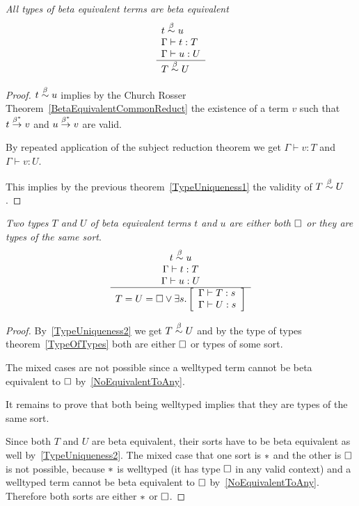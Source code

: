 \begin{theorem}
    \label{TypeUniqueness2}
    \emph{All types of beta equivalent terms are beta equivalent}
    $$
    \begin{array}{l} 
        t \stackrel{\beta}{\sim} u
        \\
        \Gamma \vdash t : T
        \\
        \Gamma \vdash u : U
     \\ \hline 
        T \stackrel{\beta}{\sim} U
    \end{array}
    $$

    \begin{proof}
        $ t \stackrel{\beta}{\sim} u$ implies by the Church Rosser
        Theorem~\ref{BetaEquivalentCommonReduct} the existence of a term $v$
        such that $t \stackrel{\beta^*}{\to} v$ and $u \stackrel{\beta^*}{\to} v$ are valid.

        By repeated application of the subject reduction theorem we get $\Gamma
        \vdash v : T$ and $\Gamma \vdash v : U$.

        This implies by the previous theorem~\ref{TypeUniqueness1} the validity
        of $T \stackrel{\beta}{\sim} U$.
    \end{proof}
\end{theorem}


\begin{corollary}
    \label{TypeUniqueness3}
    \emph{Two types $T$ and $U$ of beta equivalent terms $t$ and $u$ are either
    both $\Box$ or they are types of the same sort}.
    $$
    \begin{array}{c} 
        t \stackrel{\beta}{\sim} u
        \\
        \Gamma \vdash t : T
        \\
        \Gamma \vdash u : U
     \\ \hline 
        T = U = \Box
        \lor
        \exists s.
        \left[
        \begin{array}{l}
            \Gamma \vdash T : s
            \\
            \Gamma \vdash U : s
        \end{array}
        \right]
    \end{array}
    $$

    \begin{proof}
        By~\ref{TypeUniqueness2} we get $T \stackrel{\beta}{\sim} U$ and by the type of types
        theorem~\ref{TypeOfTypes} both are either $\Box$ or types of some sort.

        The mixed cases are not possible since a welltyped term cannot be beta
        equivalent to $\Box$ by~\ref{NoEquivalentToAny}.

        It remains to prove that both being welltyped implies that they are
        types of the same sort.

        Since both $T$ and $U$ are beta equivalent, their sorts have to be beta
        equivalent as well by~\ref{TypeUniqueness2}. The mixed case that one
        sort is $*$ and the other is $\Box$ is not possible, because $*$
        is welltyped (it has type $\Box$ in any valid context) and a welltyped
        term cannot be beta equivalent to $\Box$ by~\ref{NoEquivalentToAny}.
        Therefore both sorts are either $*$ or $\Box$.
    \end{proof}
\end{corollary}




